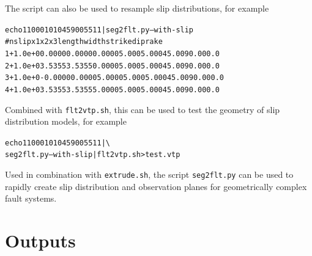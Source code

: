 \documentclass[10pt]{article}
\begin{document}
The script can also be used to resample slip distributions, for example
\begin{alltt}
{\color{orange}echo 1 1 0 0 0 10 10 45 90 0 5 5 1 1 | seg2flt.py --with-slip}
{\color{blue}#  n    slip       x1       x2       x3   length   width  strike   dip rake
   1 +1.0e+0   0.0000   0.0000   0.0000    5.000   5.000   45.00 90.00  0.0
   2 +1.0e+0   3.5355   3.5355   0.0000    5.000   5.000   45.00 90.00  0.0
   3 +1.0e+0  -0.0000   0.0000   5.0000    5.000   5.000   45.00 90.00  0.0
   4 +1.0e+0   3.5355   3.5355   5.0000    5.000   5.000   45.00 90.00  0.0}
\end{alltt}
Combined with \verb'flt2vtp.sh', this can be used to test the geometry of slip distribution models, for example
\begin{alltt}
{\color{orange}echo 1 1 0 0 0 10 10 45 90 0 5 5 1 1 | \textbackslash
             seg2flt.py --with-slip | flt2vtp.sh > test.vtp}
\end{alltt}

Used in combination with \verb'extrude.sh', the script \verb'seg2flt.py' can be used to rapidly create slip distribution and observation planes for geometrically complex fault systems.

\section{Outputs}
\end{document}
